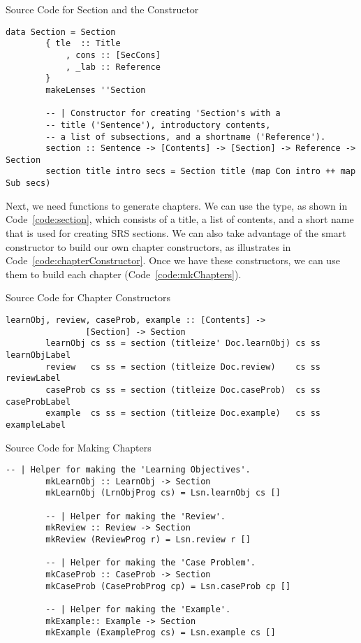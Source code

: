 \begin{listing}[h!]
	\caption{Source Code for Section and the Constructor}
	\label{code:section}
	\begin{lstlisting}[language=haskell1]
		data Section = Section
		{ tle  :: Title
			, cons :: [SecCons]
			, _lab :: Reference
		}
		makeLenses ''Section
		
		-- | Constructor for creating 'Section's with a 
		-- title ('Sentence'), introductory contents, 
		-- a list of subsections, and a	shortname ('Reference').
		section :: Sentence -> [Contents] -> [Section] -> Reference -> Section
		section title intro secs = Section title (map Con intro ++ map Sub secs)
	\end{lstlisting}
\end{listing}

Next, we need functions to generate chapters. We can use the  
type, as shown in Code~\ref{code:section}, which consists of a title, a list of 
contents, and a short name that is used for creating SRS sections. We can also 
take advantage of the  smart constructor to build our own 
chapter constructors, as illustrates in Code~\ref{code:chapterConstructor}. 
Once we have these constructors, we can use them to build each chapter 
(Code~\ref{code:mkChapters}).

\begin{listing}[h!]
	\caption{Source Code for Chapter Constructors} 
	\label{code:chapterConstructor}
	\begin{lstlisting}[language=haskell1]
		learnObj, review, caseProb, example :: [Contents] -> 
				[Section] -> Section
		learnObj cs ss = section (titleize' Doc.learnObj) cs ss learnObjLabel
		review   cs ss = section (titleize Doc.review)    cs ss reviewLabel
		caseProb cs ss = section (titleize Doc.caseProb)  cs ss caseProbLabel
		example  cs ss = section (titleize Doc.example)   cs ss exampleLabel
	\end{lstlisting}
\end{listing}

\begin{listing}[h!]
	\caption{Source Code for Making Chapters} 
	\label{code:mkChapters}
	\begin{lstlisting}[language=haskell1]				
		-- | Helper for making the 'Learning Objectives'.
		mkLearnObj :: LearnObj -> Section
		mkLearnObj (LrnObjProg cs) = Lsn.learnObj cs []
		
		-- | Helper for making the 'Review'.
		mkReview :: Review -> Section
		mkReview (ReviewProg r) = Lsn.review r [] 
		
		-- | Helper for making the 'Case Problem'.
		mkCaseProb :: CaseProb -> Section
		mkCaseProb (CaseProbProg cp) = Lsn.caseProb cp [] 
		
		-- | Helper for making the 'Example'.
		mkExample:: Example -> Section
		mkExample (ExampleProg cs) = Lsn.example cs []
	\end{lstlisting}
\end{listing}

